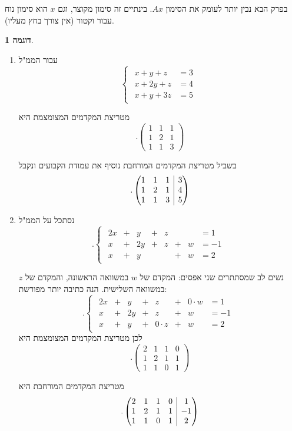 \documentclass[12pt]{report}
\theoremstyle{plain}
\theoremstyle{definition}
\newtheorem{example}{דוגמה}[chapter]
\newcommand{\0}{\mathbf{0}}
\begin{document}
בפרק הבא נבין יותר לעומק את הסימון
$Ax$.
בינתיים זה סימון מקוצר, וגם
$x$
הוא סימון נוח עבור וקטור (אין צורך בחץ מעליו).

\begin{example}\
\begin{enumerate}[label=\alph*.]
\item
עבור הממ"ל
$$
\begin{cases}
\begin{aligned}
x+y+z&=3\\
x+2y+z&=4\\
x+y+3z&=5
\end{aligned}
\end{cases}
$$

מטריצת המקדמים המצומצמת היא
$$
.\begin{pmatrix}1 & 1 & 1\\
1 & 2 & 1\\
1 & 1 & 3
\end{pmatrix}
$$

בשביל מטריצת המקדמים המורחבת נוסיף את עמודת הקבועים ונקבל
$$
.\left( \begin{array}{@{}ccc|c@{}}
1 & 1 & 1 & 3\\
1 & 2 & 1 & 4\\
1 & 1 & 3 & 5
\end{array} \right)
$$

\item
נסתכל על הממ"ל
$$
.\begin{cases}
\begin{alignedat}{7}
2x &{}+{}&  y &{}+{}&  z &     &      &= 1 \\[4pt]
 x &{}+{}& 2y &{}+{}&  z &{}+{}&  w &= -1 \\[4pt]
 x &{}+{}&  y &     &     &{}+{}&  w &= 2
\end{alignedat}
\end{cases}
$$

נשים לב שמסתתרים שני אפסים: המקדם של $w$ במשוואה הראשונה, והמקדם
של $z$ במשוואה השלישית. הנה כתיבה יותר מפורשת:
$$
.\begin{cases}
\begin{alignedat}{7}
2x &{}+{}&  y &{}+{}&  z &{}+{}& 0\!\cdot\! w &=  1 \\[4pt]
 x &{}+{}& 2y &{}+{}&  z &{}+{}&     w &= -1 \\[4pt]
 x &{}+{}&  y &{}+{}& 0\!\cdot\! z &{}+{}&     w &=  2
\end{alignedat}
\end{cases}
$$
לכן מטריצת המקדמים המצומצמת היא
$$
.\begin{pmatrix}2 & 1 & 1 & 0\\
1 & 2 & 1 & 1\\
1 & 1 & 0 & 1
\end{pmatrix}
$$

מטריצת המקדמים המורחבת היא 
$$
.\left( \begin{array}{@{}cccc|c@{}}
	2 & 1 & 1 & 0 & 1\\
	1 & 2 & 1 & 1 & -1\\
	1 & 1 & 0 & 1 & 2
\end{array} \right)
$$
\end{enumerate}
\end{example}
\end{document}
